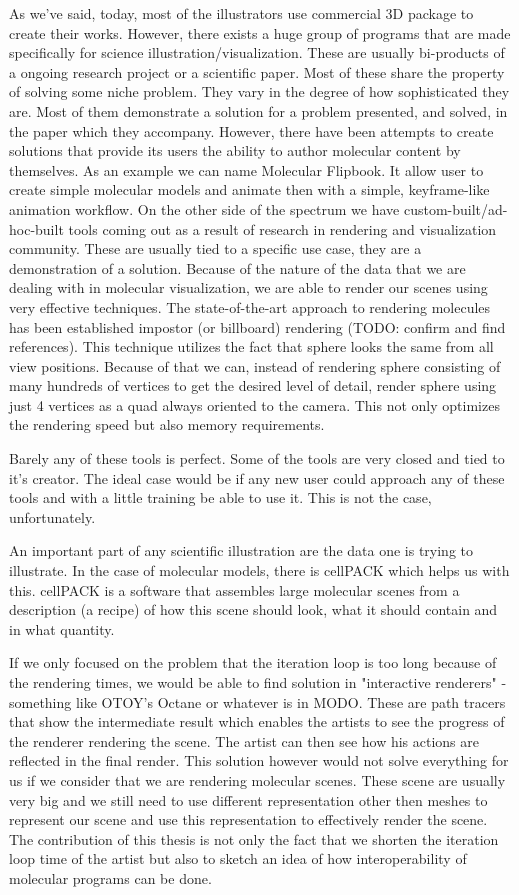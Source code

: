 \documentclass[
  digital, %
  table,   %
  lof,     %
  lot,     %
]{fithesis3}
\begin{document}
As we've said, today, most of the illustrators use commercial 3D package to create their works. However, there exists a huge group of programs that are made specifically for science illustration/visualization. These are usually bi-products of a ongoing research project or a scientific paper. Most of these share the property of solving some niche problem. They vary in the degree of how sophisticated they are. Most of them demonstrate a solution for a problem presented, and solved, in the paper which they accompany. However, there have been attempts to create solutions that provide its users the ability to author molecular content by themselves. As an example we can name Molecular Flipbook. It allow user to create simple molecular models and animate then with a simple, keyframe-like animation workflow.
On the other side of the spectrum we have custom-built/ad-hoc-built tools coming out as a result of research in rendering and visualization community. These are usually tied to a specific use case, they are a demonstration of a solution. Because of the nature of the data that we are dealing with in molecular visualization, we are able to render our scenes using very effective techniques. The state-of-the-art approach to rendering molecules has been established impostor (or billboard) rendering (TODO: confirm and find references). This technique utilizes the fact that sphere looks the same from all view positions. Because of that we can, instead of rendering sphere consisting of many hundreds of vertices to get the desired level of detail, render sphere using just 4 vertices as a quad always oriented to the camera. This not only optimizes the rendering speed but also memory requirements.

Barely any of these tools is perfect. Some of the tools are very closed and tied to it's creator. The ideal case would be if any new user could approach any of these tools and with a little training be able to use it. This is not the case, unfortunately.


An important part of any scientific illustration are the data one is trying to illustrate. In the case of molecular models, there is cellPACK which helps us with this. cellPACK is a software that assembles large molecular scenes from a description (a recipe) of how this scene should look, what it should contain and in what quantity.

If we only focused on the problem that the iteration loop is too long because of the rendering times, we would be able to find solution in "interactive renderers" - something like OTOY's Octane or whatever is in MODO. These are path tracers that show the intermediate result which enables the artists to see the progress of the renderer rendering the scene. The artist can then see how his actions are reflected in the final render. This solution however would not solve everything for us if we consider that we are rendering molecular scenes. These scene are usually very big and we still need to use different representation other then meshes to represent our scene and use this representation to effectively render the scene. The contribution of this thesis is not only the fact that we shorten the iteration loop time of the artist but also to sketch an idea of how interoperability of molecular programs can be done.
\end{document}
